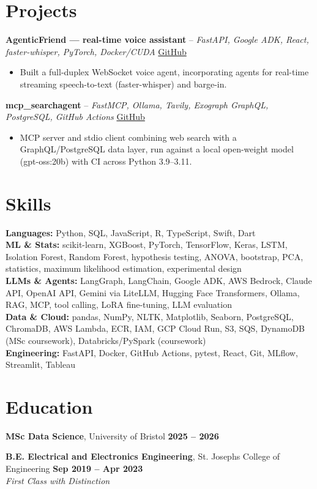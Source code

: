 \documentclass[a4paper,10pt]{article}
\begin{document}
\section{Projects}
\noindent\textbf{AgenticFriend — real-time voice assistant} -- \textit{FastAPI, Google ADK, React, faster-whisper, PyTorch, Docker/CUDA} \hfill \href{https://github.com/Thiruvel-AP/adk_multi-agent}{GitHub}
\begin{itemize}
  \item Built a full-duplex WebSocket voice agent, incorporating agents for real-time streaming speech-to-text (faster-whisper) and barge-in.
\end{itemize}
\noindent\textbf{mcp\_searchagent} -- \textit{FastMCP, Ollama, Tavily, Exograph GraphQL, PostgreSQL, GitHub Actions} \hfill \href{https://github.com/Thiruvel-AP/mcp_searchagent}{GitHub}
\begin{itemize}
  \item MCP server and stdio client combining web search with a GraphQL/PostgreSQL data layer, run against a local open-weight model (gpt-oss:20b) with CI across Python 3.9–3.11.
\end{itemize}

\section{Skills}
\textbf{Languages:} Python, SQL, JavaScript, R, TypeScript, Swift, Dart\\
\textbf{ML \& Stats:} scikit-learn, XGBoost, PyTorch, TensorFlow, Keras, LSTM, Isolation Forest, Random Forest, hypothesis testing, ANOVA, bootstrap, PCA, statistics, maximum likelihood estimation, experimental design\\
\textbf{LLMs \& Agents:} LangGraph, LangChain, Google ADK, AWS Bedrock, Claude API, OpenAI API, Gemini via LiteLLM, Hugging Face Transformers, Ollama, RAG, MCP, tool calling, LoRA fine-tuning, LLM evaluation\\
\textbf{Data \& Cloud:} pandas, NumPy, NLTK, Matplotlib, Seaborn, PostgreSQL, ChromaDB, AWS Lambda, ECR, IAM, GCP Cloud Run, S3, SQS, DynamoDB (MSc coursework), Databricks/PySpark (coursework)\\
\textbf{Engineering:} FastAPI, Docker, GitHub Actions, pytest, React, Git, MLflow, Streamlit, Tableau

\section{Education}
\textbf{MSc Data Science}, University of Bristol \hfill \textbf{2025 – 2026}\par
\vspace{2pt}
\textbf{B.E. Electrical and Electronics Engineering}, St. Joseph\textquotesingle{}s College of Engineering \hfill \textbf{Sep 2019 – Apr 2023}\\ \textit{First Class with Distinction}\par
\end{document}
